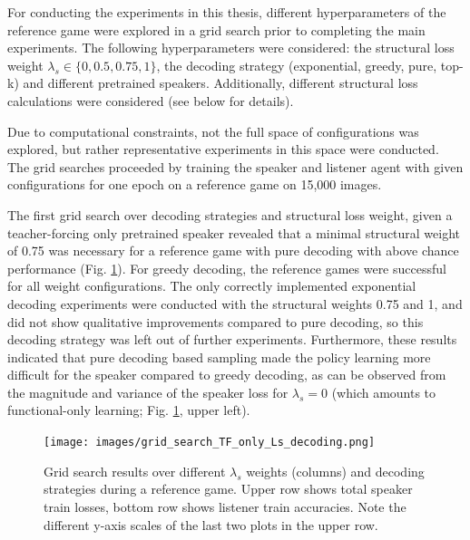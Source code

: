 For conducting the experiments in this thesis, different hyperparameters of the reference game were explored in a grid search prior to completing the main experiments. The following hyperparameters were considered: the structural loss weight $\lambda_s \in \{0, 0.5, 0.75, 1\}$, the decoding strategy (exponential, greedy, pure, top-k) and different pretrained speakers. Additionally, different structural loss calculations were considered (see below for details). 

Due to computational constraints, not the full space of configurations was explored, but rather representative experiments in this space were conducted. The grid searches proceeded by training the speaker and listener agent with given configurations for one epoch on a reference game on 15,000 images. 

The first grid search over decoding strategies and structural loss weight, given a teacher-forcing only pretrained speaker revealed that a minimal structural weight of 0.75 was necessary for a reference game with pure decoding with above chance performance (Fig. \ref{fig:coco_grid_Ls_decoding_TF_only}). For greedy decoding, the reference games were successful for all weight configurations. The only correctly implemented exponential decoding experiments were conducted with the structural weights 0.75 and 1, and did not show qualitative improvements compared to pure decoding, so this decoding strategy was left out of further experiments. Furthermore, these results indicated that pure decoding based sampling made the policy learning more difficult for the speaker compared to greedy decoding, as can be observed from the magnitude and variance of the speaker loss for $\lambda_s = 0$ (which amounts to functional-only learning; Fig. \ref{fig:coco_grid_Ls_decoding_TF_only}, upper left).

\begin{figure}[h]
	\centering
	\texttt{[image: images/grid\_search\_TF\_only\_Ls\_decoding.png]}
	\caption{Grid search results over different $\lambda_s$ weights (columns) and decoding strategies during a reference game. Upper row shows total speaker train losses, bottom row shows listener train accuracies. Note the different y-axis scales of the last two plots in the upper row.}
	\label{fig:coco_grid_Ls_decoding_TF_only}
\end{figure}

